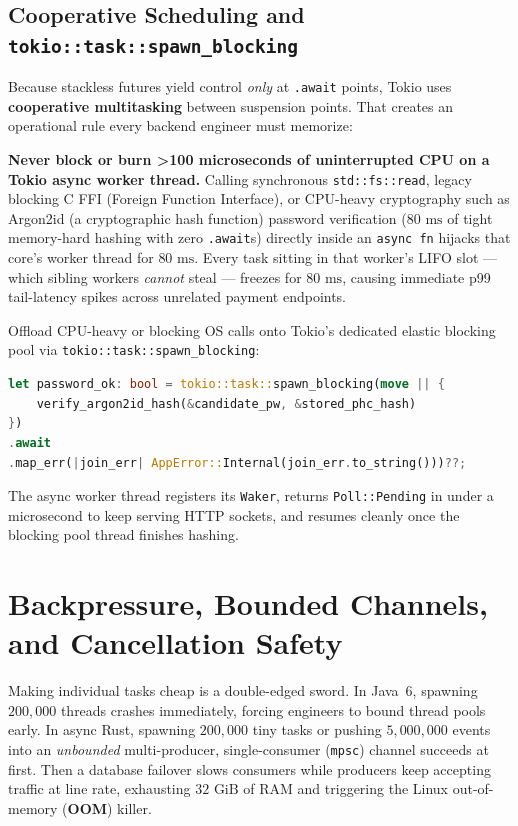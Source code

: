 \subsection{Cooperative Scheduling and \texttt{tokio::task::spawn\_blocking}}

Because stackless futures yield control \emph{only} at \texttt{.await} points, Tokio uses \textbf{cooperative multitasking} between suspension points. That creates an operational rule every backend engineer must memorize:

\begin{focusbox}
\textbf{Never block or burn >100 microseconds of uninterrupted CPU on a Tokio async worker thread.} Calling synchronous \texttt{std::fs::read}, legacy blocking C FFI (Foreign Function Interface), or CPU-heavy cryptography such as Argon2id (a cryptographic hash function) password verification ($80\text{ ms}$ of tight memory-hard hashing with zero \texttt{.await}s) directly inside an \texttt{async fn} hijacks that core's worker thread for $80\text{ ms}$. Every task sitting in that worker's LIFO slot --- which sibling workers \emph{cannot} steal --- freezes for $80\text{ ms}$, causing immediate p99 tail-latency spikes across unrelated payment endpoints.

Offload CPU-heavy or blocking OS calls onto Tokio's dedicated elastic blocking pool via \texttt{tokio::task::spawn\_blocking}:
\begin{lstlisting}[language=Rust]
let password_ok: bool = tokio::task::spawn_blocking(move || {
    verify_argon2id_hash(&candidate_pw, &stored_phc_hash)
})
.await
.map_err(|join_err| AppError::Internal(join_err.to_string()))??;
\end{lstlisting}
The async worker thread registers its \texttt{Waker}, returns \texttt{Poll::Pending} in under a microsecond to keep serving HTTP sockets, and resumes cleanly once the blocking pool thread finishes hashing.
\end{focusbox}

\section{Backpressure, Bounded Channels, and Cancellation Safety}
\label{ch12:backpressure-and-cancellation}

Making individual tasks cheap is a double-edged sword. In Java~6, spawning $200{,}000$ threads crashes immediately, forcing engineers to bound thread pools early. In async Rust, spawning $200{,}000$ tiny tasks or pushing $5{,}000{,}000$ events into an \emph{unbounded} multi-producer, single-consumer (\texttt{mpsc}) channel succeeds at first. Then a database failover slows consumers while producers keep accepting traffic at line rate, exhausting $32\text{ GiB}$ of RAM and triggering the Linux out-of-memory (\textbf{OOM}) killer.

